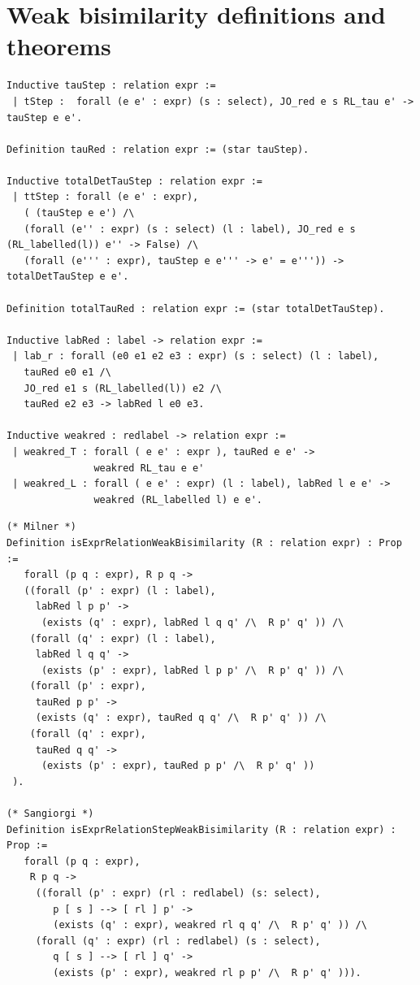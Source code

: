 \documentclass[12pt,twoside,notitlepage]{report}
\theoremstyle{plain}%
\theoremstyle{definition}
\theoremstyle{remark}
\begin{document}
\section{Weak bisimilarity definitions and theorems}
\begin{minipage}{\linewidth}
\begin{lstlisting}[language={Coq}, caption={Definitions of reduction relations}]
Inductive tauStep : relation expr :=
 | tStep :  forall (e e' : expr) (s : select), JO_red e s RL_tau e' -> tauStep e e'.

Definition tauRed : relation expr := (star tauStep).

Inductive totalDetTauStep : relation expr :=
 | ttStep : forall (e e' : expr),
   ( (tauStep e e') /\ 
   (forall (e'' : expr) (s : select) (l : label), JO_red e s (RL_labelled(l)) e'' -> False) /\ 
   (forall (e''' : expr), tauStep e e''' -> e' = e''')) -> totalDetTauStep e e'.
 
Definition totalTauRed : relation expr := (star totalDetTauStep).

Inductive labRed : label -> relation expr :=
 | lab_r : forall (e0 e1 e2 e3 : expr) (s : select) (l : label),
   tauRed e0 e1 /\
   JO_red e1 s (RL_labelled(l)) e2 /\
   tauRed e2 e3 -> labRed l e0 e3.
   
Inductive weakred : redlabel -> relation expr :=
 | weakred_T : forall ( e e' : expr ), tauRed e e' -> 
               weakred RL_tau e e'
 | weakred_L : forall ( e e' : expr) (l : label), labRed l e e' -> 
               weakred (RL_labelled l) e e'.               
\end{lstlisting}
\end{minipage}

\begin{minipage}{\linewidth}
\begin{lstlisting}[language={Coq}, caption={Definitions of weak bisimilarity}]
(* Milner *)
Definition isExprRelationWeakBisimilarity (R : relation expr) : Prop :=
   forall (p q : expr), R p q -> 
   ((forall (p' : expr) (l : label), 
     labRed l p p' ->
      (exists (q' : expr), labRed l q q' /\  R p' q' )) /\
    (forall (q' : expr) (l : label),
     labRed l q q' ->
      (exists (p' : expr), labRed l p p' /\  R p' q' )) /\ 
    (forall (p' : expr),
     tauRed p p' -> 
     (exists (q' : expr), tauRed q q' /\  R p' q' )) /\
    (forall (q' : expr), 
     tauRed q q' ->
      (exists (p' : expr), tauRed p p' /\  R p' q' ))
 ).

(* Sangiorgi *)
Definition isExprRelationStepWeakBisimilarity (R : relation expr) : Prop :=
   forall (p q : expr),
    R p q -> 
     ((forall (p' : expr) (rl : redlabel) (s: select),
        p [ s ] --> [ rl ] p' -> 
        (exists (q' : expr), weakred rl q q' /\  R p' q' )) /\
     (forall (q' : expr) (rl : redlabel) (s : select),
        q [ s ] --> [ rl ] q' ->
        (exists (p' : expr), weakred rl p p' /\  R p' q' ))).            
\end{lstlisting}
\end{minipage}
\end{document}

